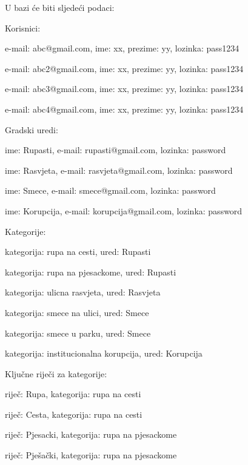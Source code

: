 			U bazi će biti sljedeći podaci:
			\begin{packed_item}
				\item Korisnici:
				\begin{packed_item}
					\item e-mail: abc@gmail.com, ime: xx, prezime: yy, lozinka: pass1234
					\item e-mail: abc2@gmail.com, ime: xx, prezime: yy, lozinka: pass1234
					\item e-mail: abc3@gmail.com, ime: xx, prezime: yy, lozinka: pass1234
					\item e-mail: abc4@gmail.com, ime: xx, prezime: yy, lozinka: pass1234
				\end{packed_item}
				\item Gradski uredi:
				\begin{packed_item}
					\item ime: Rupasti, e-mail: rupasti@gmail.com, lozinka: password
					\item ime: Rasvjeta, e-mail: rasvjeta@gmail.com, lozinka: password
					\item ime: Smece, e-mail: smece@gmail.com, lozinka: password
					\item ime: Korupcija, e-mail: korupcija@gmail.com, lozinka: password
				\end{packed_item}
				\item Kategorije:
				\begin{packed_item}
					\item kategorija: rupa na cesti, ured: Rupasti
					\item kategorija: rupa na pjesackome, ured: Rupasti
					\item kategorija: ulicna rasvjeta, ured: Rasvjeta
					\item kategorija: smece na ulici, ured: Smece
					\item kategorija: smece u parku, ured: Smece
					\item kategorija: institucionalna korupcija, ured: Korupcija
				\end{packed_item}
				\item Ključne riječi za kategorije:
				\begin{packed_item}
					\item riječ: Rupa, kategorija: rupa na cesti
					\item riječ: Cesta, kategorija: rupa na cesti
					\item riječ: Pjesacki, kategorija: rupa na pjesackome
					\item riječ: Pješački, kategorija: rupa na pjesackome

\end{packed_item}
\end{packed_item}
